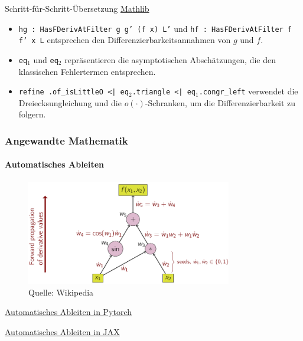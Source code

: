 \documentclass{beamer}
\begin{document}
\begin{frame}
    \begin{block}{Schritt-für-Schritt-Übersetzung \href{https://github.com/leanprover-community/mathlib4/blob/f4f0b47a2f859d27e965c812344deb1435fe8d48/Mathlib/Analysis/Calculus/FDeriv/Comp.lean\#L51-L57}{Mathlib}}
        \begin{itemize}
            \item \texttt{hg : HasFDerivAtFilter g g' (f x) L'} und \texttt{hf : HasFDerivAtFilter f f' x L} entsprechen den Differenzierbarkeitsannahmen von \( g \) und \( f \).
            \item \texttt{eq\(_1\)} und \texttt{eq\(_2\)} repräsentieren die asymptotischen Abschätzungen, die den klassischen Fehlertermen entsprechen.
            \item \texttt{refine .of\_isLittleO <| eq\(_2\).triangle <| eq\(_1\).congr\_left} verwendet die Dreiecksungleichung und die \( o(\cdot) \)-Schranken, um die Differenzierbarkeit zu folgern.
        \end{itemize}
    \end{block}
\end{frame}



\begin{frame}
    \frametitle{Angewandte Mathematik}
\framesubtitle{Automatisches Ableiten}
\begin{figure}[H]
      \centering
    \includegraphics[width=0.8\textwidth]{images/ad.png}
      \caption{Quelle: Wikipedia}
\end{figure}

\href{https://pytorch.org/tutorials/beginner/blitz/autograd_tutorial.html}{Automatisches Ableiten  in Pytorch}

\href{https://jax.readthedocs.io/en/latest/notebooks/quickstart.html}{Automatisches Ableiten  in JAX}

 \end{frame}
\end{document}
